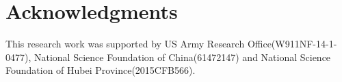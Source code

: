 \documentclass{article}
\begin{document}

\section*{Acknowledgments}
This research work was supported by US Army Research Office(W911NF-14-1-0477), National Science Foundation of China(61472147) and National Science Foundation of Hubei Province(2015CFB566).

\small



%
%

%
\end{document}
